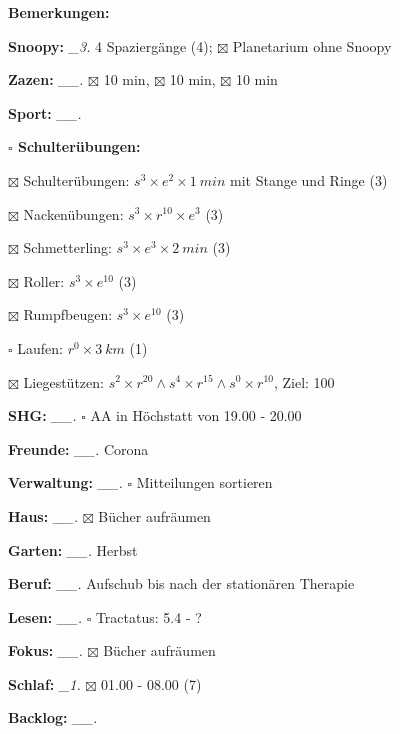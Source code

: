 \documentclass[10pt,a4paper]{article}
\newcommand\prop[1] {{\color {alizarin} {\bf #1}}}             %
\newcommand\mand[1] {{\color {burntorange} {\bf #1}}}          %
\newcommand\topspace{\vskip -15pt \hskip 20pt}
\newcommand\bottomspace{\vskip 4pt}
\newcommand\n[1] { {\sl #1.} \hskip 5pt }
\begin{document}
\begin{mdframed}[style=daystyle]
\begin{labeling}{{\mand {Bemerkungen:}}}
      \bottomspace
  \item[{\mand {Snoopy:}}]        \n{\_3} 4 Spaziergänge (4); $\boxtimes$ Planetarium ohne Snoopy
  \item[{\mand {Zazen:}}]        \n{\_\_} $\boxtimes$ 10 min, $\boxtimes$ 10 min, $\boxtimes$ 10 min
  \item[{\mand {Sport:}}]        \n{\_\_}
    \topspace
    \begin{minipage}{0.75\textwidth}  
      \begin{labeling}{\prop {$\square$ {Schulterübungen:}}} 
        \setlength\itemsep{-3pt}
      \item[$\boxtimes$ Schulterübungen:] $s^3 \times e^2 \times 1\ min$ mit Stange und Ringe (3)
      \item[$\boxtimes$ Nackenübungen:]   $s^3 \times r^{10} \times e^3$ (3)
      \item[$\boxtimes$ Schmetterling:]   $s^3 \times e^3 \times 2\ min$ (3)
      \item[$\boxtimes$ Roller:]          $s^3 \times e^{10}$ (3)
      \item[$\boxtimes$ Rumpfbeugen:]     $s^3 \times e^{10}$ (3)
      \item[$\square$ Laufen:]          $r^0 \times 3\ km$ (1)
      \item[$\boxtimes$ Liegestützen:]    $s^2 \times r^{20} \land s^4 \times r^{15} \land s^0 \times r^{10}$, Ziel: 100
      \end{labeling}
    \end{minipage}
    \bottomspace        
  \item[{\mand {SHG:}}]          \n{\_\_} $\square$ AA in Höchstatt von 19.00 - 20.00
  \item[{\mand {Freunde:}}]      \n{\_\_} Corona
  \item[{\mand {Verwaltung:}}]   \n{\_\_} $\square$ Mitteilungen sortieren
  \item[{\mand {Haus:}}]         \n{\_\_} $\boxtimes$ Bücher aufräumen
  \item[{\mand {Garten:}}]       \n{\_\_} Herbst
  \item[{\mand {Beruf:}}]        \n{\_\_} Aufschub bis nach der stationären Therapie
  \item[{\mand {Lesen:}}]        \n{\_\_} $\square$ Tractatus: 5.4 - ?
  \item[{\mand {Fokus:}}]        \n{\_\_} $\boxtimes$ Bücher aufräumen
  \item[{\mand {Schlaf:}}]        \n{\_1} $\boxtimes$ 01.00 - 08.00 (7)
  \item[{\mand {Backlog:}}]      \n{\_\_} 

\end{labeling}
\end{mdframed}
\end{document}
